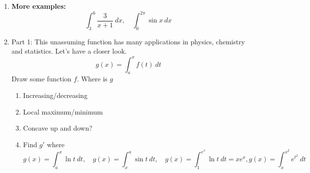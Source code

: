 \documentclass{article}
\begin{document}
\begin{enumerate}
\item {\bf More examples:}
$$
\int_3^6 \frac{3}{x+1}~dx,\quad \int_0^{2\pi} \sin x~dx
$$

\item Part 1: This unassuming function has many applications in physics, chemistry and statistics. Let's have a closer look.
$$
g(x) = \int_a^x f(t)~dt
$$
Draw some function $f$. Where is $g$
\begin{enumerate}
\item Increasing/decreasing
\item Local maximum/minimum
\item Concave up and down?
\item Find $g'$ where
$$
g(x) = \int_a^x\ln t~dt,\quad g(x) = \int_x^a\sin t~dt, \quad g(x) = \int_1^{e^x}\ln t~dt = xe^x, g(x) = \int_{x}^{x^2} e^{t^2}~dt 
$$
\end{enumerate}
\end{enumerate}



\end{document}
